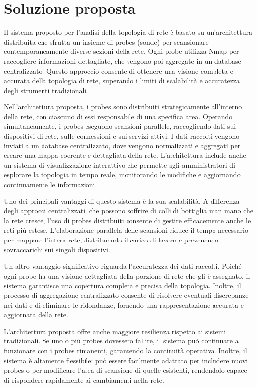 \documentclass[target=bach,aauheader=,style=]{thud}
\begin{document}
\chapter{Soluzione proposta}
Il sistema proposto per l'analisi della topologia di rete è basato su un'architettura distribuita che sfrutta un insieme di probes (sonde) per scansionare contemporaneamente diverse sezioni della rete. Ogni probe utilizza Nmap per raccogliere informazioni dettagliate, che vengono poi aggregate in un database centralizzato. Questo approccio consente di ottenere una visione completa e accurata della topologia di rete, superando i limiti di scalabilità e accuratezza degli strumenti tradizionali.

Nell'architettura proposta, i probes sono distribuiti strategicamente all'interno della rete, con ciascuno di essi responsabile di una specifica area. Operando simultaneamente, i probes eseguono scansioni parallele, raccogliendo dati sui dispositivi di rete, sulle connessioni e sui servizi attivi. I dati raccolti vengono inviati a un database centralizzato, dove vengono normalizzati e aggregati per creare una mappa coerente e dettagliata della rete. L'architettura include anche un sistema di visualizzazione interattivo che permette agli amministratori di esplorare la topologia in tempo reale, monitorando le modifiche e aggiornando continuamente le informazioni.

Uno dei principali vantaggi di questo sistema è la sua scalabilità. A differenza degli approcci centralizzati, che possono soffrire di colli di bottiglia man mano che la rete cresce, l'uso di probes distribuiti consente di gestire efficacemente anche le reti più estese. L'elaborazione parallela delle scansioni riduce il tempo necessario per mappare l'intera rete, distribuendo il carico di lavoro e prevenendo sovraccarichi sui singoli dispositivi.

Un altro vantaggio significativo riguarda l'accuratezza dei dati raccolti. Poiché ogni probe ha una visione dettagliata della porzione di rete che gli è assegnato, il sistema garantisce una copertura completa e precisa della topologia. Inoltre, il processo di aggregazione centralizzato consente di risolvere eventuali discrepanze nei dati e di eliminare le ridondanze, fornendo una rappresentazione accurata e aggiornata della rete.

L'architettura proposta offre anche maggiore resilienza rispetto ai sistemi tradizionali. Se uno o più probes dovessero fallire, il sistema può continuare a funzionare con i probes rimanenti, garantendo la continuità operativa. Inoltre, il sistema è altamente flessibile: può essere facilmente adattato per includere nuovi probes o per modificare l'area di scansione di quelle esistenti, rendendolo capace di rispondere rapidamente ai cambiamenti nella rete.
\end{document}
